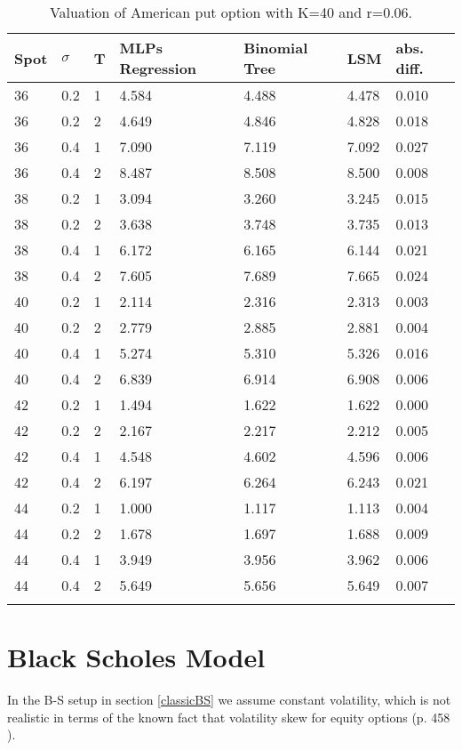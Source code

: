 \begin{table}[th]
\caption{Valuation of American put option with K=40 and r=0.06.}
\label{tab:treatments}
\centering
\begin{tabular}{l l l l l l l }
\toprule
\textbf{Spot} & \textbf{$\sigma$} & \textbf{T} & \textbf{MLPs Regression} & \textbf{Binomial Tree} & \textbf{LSM} & \textbf{abs. diff.} \\
\midrule
36 & 0.2 & 1 & 4.584 & 4.488 & 4.478 & 0.010\\
36 & 0.2 & 2 & 4.649 & 4.846 & 4.828 & 0.018\\
36 & 0.4 & 1 & 7.090 & 7.119 & 7.092 & 0.027\\
36 & 0.4 & 2 & 8.487 & 8.508 & 8.500 & 0.008\\
38 & 0.2 & 1 & 3.094 & 3.260 & 3.245 & 0.015\\
38 & 0.2 & 2 & 3.638 & 3.748 & 3.735 & 0.013\\
38 & 0.4 & 1 & 6.172 & 6.165 & 6.144 & 0.021\\
38 & 0.4 & 2 & 7.605 & 7.689 & 7.665 & 0.024\\
40 & 0.2 & 1 & 2.114 & 2.316 & 2.313 & 0.003\\
40 & 0.2 & 2 & 2.779 & 2.885 & 2.881 & 0.004\\
40 & 0.4 & 1 & 5.274 & 5.310 & 5.326 & 0.016\\
40 & 0.4 & 2 & 6.839 & 6.914 & 6.908 & 0.006\\
42 & 0.2 & 1 & 1.494 & 1.622 & 1.622 & 0.000\\
42 & 0.2 & 2 & 2.167 & 2.217 & 2.212 & 0.005\\
42 & 0.4 & 1 & 4.548 & 4.602 & 4.596 & 0.006\\
42 & 0.4 & 2 & 6.197 & 6.264 & 6.243 & 0.021\\
44 & 0.2 & 1 & 1.000 & 1.117 & 1.113 & 0.004\\
44 & 0.2 & 2 & 1.678 & 1.697 & 1.688 & 0.009\\
44 & 0.4 & 1 & 3.949 & 3.956 & 3.962 & 0.006\\
44 & 0.4 & 2 & 5.649 & 5.656 & 5.649 & 0.007\\
\bottomrule\\
\end{tabular}
\end{table}
\parencite{liaw2018tune}

\section{Black Scholes Model}
In the B-S setup in section \ref{classicBS} we assume constant volatility, which is not realistic in terms of the known fact that volatility skew for equity options (p. 458 \parencite{Hull}).

